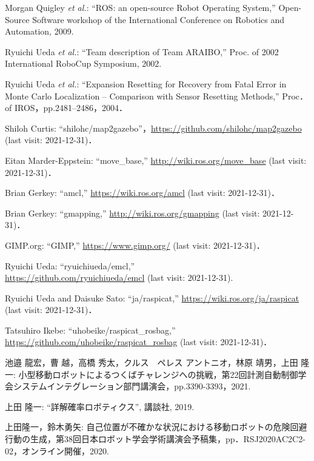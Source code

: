 \documentclass[twocolumn,9pt]{jsproceedings}
\begin{document}
\footnotesize
\begin{thebibliography}{99}
	  Morgan Quigley {\it et al.}: ``ROS: an open-source Robot Operating System,'' 
Open-Source Software workshop of the International Conference on Robotics and Automation, 2009. 

	Ryuichi Ueda {\it et al.}: 
``Team description of Team ARAIBO,'' 
Proc. of 2002 International RoboCup Symposium, 2002. 

	Ryuichi Ueda {\it et al.}: 
  ``Expansion Resetting for Recovery from Fatal Error in Monte Carlo Localization -- Comparison with Sensor Resetting Methods,'' Proc．of IROS，pp.2481--2486，2004．
  
  Shiloh Curtis: ``shilohc/map2gazebo''，\url{https://github.com/shilohc/map2gazebo} (last visit: 2021-12-31)．
  
  Eitan Marder-Eppstein: ``move\_base,'' \url{http://wiki.ros.org/move_base} (last visit: 2021-12-31)．
  
  Brian Gerkey: ``amcl,'' \url{https://wiki.ros.org/amcl} (last visit: 2021-12-31)．

  Brian Gerkey: ``gmapping,'' \url{http://wiki.ros.org/gmapping} (last visit: 2021-12-31)．
  
  GIMP.org: ``GIMP,'' \url{https://www.gimp.org/} (last visit: 2021-12-31)．
  
  Ryuichi Ueda: ``ryuichiueda/emcl,''\\\url{https://github.com/ryuichiueda/emcl} (last visit: 2021-12-31).
  
  Ryuichi Ueda and Daisuke Sato: ``ja/raspicat,'' \url{https://wiki.ros.org/ja/raspicat} (last visit: 2021-12-31)．
  
  Tatsuhiro Ikebe: ``uhobeike/raspicat\_rosbag,'' \url{https://github.com/uhobeike/raspicat_rosbag} (last visit: 2021-12-31)．


 池邉 龍宏，曹 越，高橋 秀太，クルス　ペレス アントニオ，林原 靖男，上田 隆一: 小型移動ロボットによるつくばチャレンジへの挑戦，第22回計測自動制御学会システムインテグレーション部門講演会，pp.3390-3393，2021.

上田 隆一: ``詳解確率ロボティクス'', 講談社, 2019.

 上田隆一，鈴木勇矢: 自己位置が不確かな状況における移動ロボットの危険回避行動の生成，第38回日本ロボット学会学術講演会予稿集，pp．RSJ2020AC2C2-02，オンライン開催，2020.


\end{thebibliography}
\end{document}
